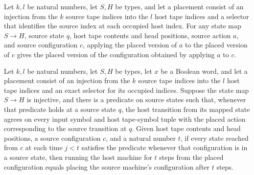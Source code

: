 \begin{lemma}
\label{Complexity.clPlaced_apply}
\leanok
{}
Let $k,l$ be natural numbers, let $S,H$ be types, and let a placement consist of an
injection from the $k$ source tape indices into the $l$ host tape indices and a selector
that identifies the source index at each occupied host index. For any state map $S\to
H$, source state $q$, host tape contents and head positions, source action $a$, and
source configuration $c$, applying the placed version of $a$ to the placed version of
$c$ gives the placed version of the configuration obtained by applying $a$ to $c$.
\end{lemma}

\begin{lemma}
\label{Complexity.clPlaced_run}
\leanok
{}
Let $k,l$ be natural numbers, let $S,H$ be types, let $x$ be a Boolean word, and let a
placement consist of an injection from the $k$ source tape indices into the $l$ host
tape indices and an exact selector for its occupied indices. Suppose the state map $S\to
H$ is injective, and there is a predicate on source states such that, whenever that
predicate holds at a source state $q$, the host transition from its mapped state agrees
on every input symbol and host tape-symbol tuple with the placed action corresponding to
the source transition at $q$. Given host tape contents and head positions, a source
configuration $c$, and a natural number $t$, if every state reached from $c$ at each
time $j<t$ satisfies the predicate whenever that configuration is in a source state,
then running the host machine for $t$ steps from the placed configuration equals placing
the source machine's configuration after $t$ steps.
\end{lemma}


